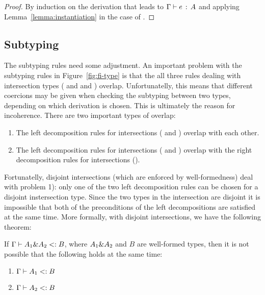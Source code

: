 \begin{proof}
  By induction on the derivation that leads to $\Gamma \vdash e \ \!:\! \ A$ and applying
  Lemma~\ref{lemma:instantiation} in the case of .
\end{proof}

\subsection{Subtyping} The subtyping rules need some adjustment. An important 
problem with the subtyping rules in Figure~\ref{fig:fi-type} is that the all three rules 
dealing with intersection types 
( and  and )
overlap. Unfortunatelly, 
this means that different coercions may be given when checking the subtyping 
between two types, depending on which derivation is chosen. This is ultimately the reason 
for incoherence.
There are two important types of overlap:

\begin{enumerate}

\item The left decomposition rules for intersections ( and ) overlap with each other. 

\item The left decomposition rules for intersections ( and )
overlap with the right decomposition rules for intersections ().

\end{enumerate}

\noindent Fortunatelly, disjoint intersections (which are enforced by well-formedness) 
deal with problem 1): only one of the two left decomposition rules
can be chosen for a disjoint instersection type. Since the two types in the intersection 
are disjoint it is impossible that both of the preconditions of the left decompositions are satisfied 
at the same time. More formally, with disjoint intersections, we have the following theorem:

\begin{lemma}
  \label{lemma:unique-subtype-contributor}

  If $\Gamma \vdash A_1 \& A_2 <: B$, where $A_1 \& A_2$ and $B$ are well-formed types,
  then it is not possible that the following holds at the same time:
  \begin{enumerate}
    \item $\Gamma \vdash A_1 <: B$
    \item $\Gamma \vdash A_2 <: B$
  \end{enumerate}
\end{lemma}


